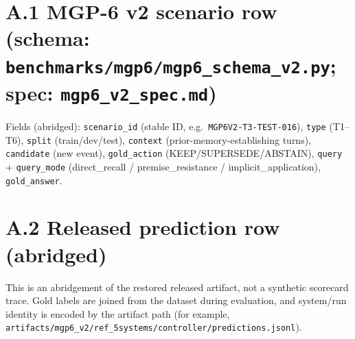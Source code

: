 \section{\texorpdfstring{A.1 MGP-6 v2 scenario row (schema:
\texttt{benchmarks/mgp6/mgp6\_schema\_v2.py}; spec:
\texttt{mgp6\_v2\_spec.md})}{A.1 MGP-6 v2 scenario row (schema: benchmarks/mgp6/mgp6\_schema\_v2.py; spec: mgp6\_v2\_spec.md)}}\label{a.1-mgp-6-v2-scenario-row-schema-benchmarksmgp6mgp6_schema_v2.py-spec-mgp6_v2_spec.md}

Fields (abridged): \texttt{scenario\_id} (stable ID,
e.g.~\texttt{MGP6V2-T3-TEST-016}), \texttt{type} (T1--T6),
\texttt{split} (train/dev/test), \texttt{context}
(prior-memory-establishing turns), \texttt{candidate} (new event),
\texttt{gold\_action} (KEEP/SUPERSEDE/ABSTAIN), \texttt{query} +
\texttt{query\_mode} (direct\_recall / premise\_resistance /
implicit\_application), \texttt{gold\_answer}.

\section{A.2 Released prediction row
(abridged)}\label{a.2-released-prediction-row-abridged}

\begin{Shaded}
\begin{Highlighting}[]
\FunctionTok{\{}
  \FunctionTok{:} \FunctionTok{,}
  \FunctionTok{:} \FunctionTok{,}
  \FunctionTok{:} \OtherTok{[}
    \FunctionTok{\{}\FunctionTok{:} \FunctionTok{,} \FunctionTok{:} \FunctionTok{,} \FunctionTok{:} \FunctionTok{\}}
  \OtherTok{]}\FunctionTok{,}
  \FunctionTok{:} \FunctionTok{,}
  \FunctionTok{:} 
\FunctionTok{\}}
\end{Highlighting}
\end{Shaded}

This is an abridgement of the restored released artifact, not a
synthetic scorecard trace. Gold labels are joined from the dataset
during evaluation, and system/run identity is encoded by the artifact
path (for example,
\texttt{artifacts/mgp6\_v2/ref\_5systems/controller/predictions.jsonl}).

